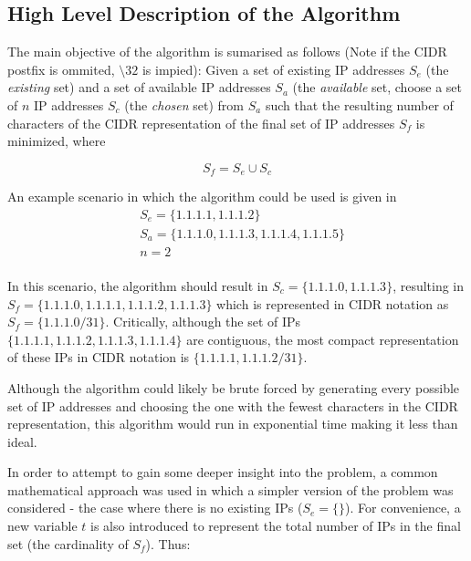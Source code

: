 \subsection{High Level Description of the Algorithm}
The main objective of the algorithm is sumarised as follows (Note if the CIDR postfix is ommited, $\setminus32$ is impied): \hfill\break\break
Given a set of existing IP addresses $S_e$ (the \textit{existing} set) and a set of available IP addresses $S_a$ (the \textit{available} set, choose a set of $n$ IP addresses $S_c$ (the \textit{chosen} set) from $S_a$ such that the resulting number of characters of the CIDR representation of the final set of IP addresses $S_f$ is minimized, where 

\begin{equation}
S_f = S_e \cup S_c
\end{equation}

An example scenario in which the algorithm could be used is given in 
\begin{equation}\label{eq:ipAlgExample}
\begin{split}
 &   S_e = \{1.1.1.1, 1.1.1.2\} \\
 &   S_a = \{1.1.1.0, 1.1.1.3, 1.1.1.4, 1.1.1.5\} \\
 &   n = 2 \\
\end{split}
\end{equation}

In this scenario, the algorithm should result in $S_c = \{1.1.1.0, 1.1.1.3\}$, resulting in $S_f = \{1.1.1.0, 1.1.1.1, 1.1.1.2, 1.1.1.3\}$ which is represented in CIDR notation as $S_f = \{1.1.1.0/31\}$. Critically, although the set of IPs $\{1.1.1.1, 1.1.1.2, 1.1.1.3, 1.1.1.4\}$ are contiguous, the most compact representation of these IPs in CIDR notation is $\{1.1.1.1, 1.1.1.2/31\}$.

Although the algorithm could likely be brute forced by generating every possible set of IP addresses and choosing the one with the fewest characters in the CIDR representation, this algorithm would run in exponential time making it less than ideal.

In order to attempt to gain some deeper insight into the problem, a common mathematical approach was used in which a simpler version of the problem was considered - the case where there is no existing IPs ($S_e = \{\}$). For convenience, a new variable $t$ is also introduced to represent the total number of IPs in the final set (the cardinality of $S_f$). Thus:

